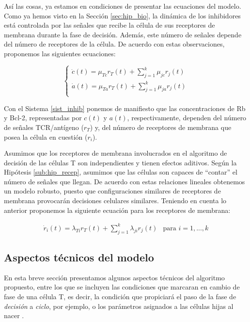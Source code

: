 Así las cosas, ya estamos en condiciones de presentar las ecuaciones del modelo. Como ya hemos visto en la Sección \ref{sec:hip_bio}, la dinámica de los inhibidores está controlada por las señales que recibe la célula de sus receptores de membrana durante la fase de decisión. Además, este número de señales depende del número de receptores de la célula. De acuerdo con estas observaciones, proponemos las siguientes ecuaciones:

\begin{equation}
	\label{sist_inhib}
	\left\{ \begin{array}{l}
	\dot{c}(t) = \mu_{Tc}r_{T}(t) + \sum_{j=1}^{k}\mu_{jc}r_{j}(t)\\
	\dot{a}(t) = \mu_{Ta}r_{T}(t) + \sum_{j=1}^{k}\mu_{ja}r_{j}(t) \\
	\end{array}
	\right.
\end{equation}

Con el Sistema \ref{sist_inhib} ponemos de manifiesto que las concentraciones de Rb y Bcl-2, representadas por $c(t)$ y $a(t)$, respectivamente, dependen del número de señales TCR/antígeno ($r_{T}$) y, del número de receptores de membrana que posea la célula en cuestión ($r_{i}$).

Asumimos que los receptores de membrana involucrados en el algoritmo de decisión de las células T son independientes y tienen efectos aditivos. Según la Hipótesis \ref{sub:hip_recep}, asumimos que las células son capaces de ``contar'' el número de señales que llegan. De acuerdo con estas relaciones lineales obtenemos un modelo robusto, puesto que configuraciones similares de receptores de membrana provocarán decisiones celulares similares. Teniendo en cuenta lo anterior proponemos la siguiente ecuación para los receptores de membrana:



\begin{equation}
	\label{sist_recep}
	\begin{array}{ll}
	\dot{r}_{i}(t) = \lambda_{Ti}r_{T}(t) + \sum_{j=1}^{k}\lambda_{ji}r_{j}(t) & \mbox{para $i=1,...,k$} 
	\end{array}
\end{equation}


\subsection{Aspectos técnicos del modelo}

En esta breve sección presentamos algunos aspectos técnicos del algoritmo propuesto, entre los que se incluyen las condiciones que marcaran en cambio de fase de una célula T, es decir, la condición que propiciará el paso de la fase de \textit{decisión} a \textit{ciclo}, por ejemplo, o los parámetros asignados a las células hijas al nacer .

